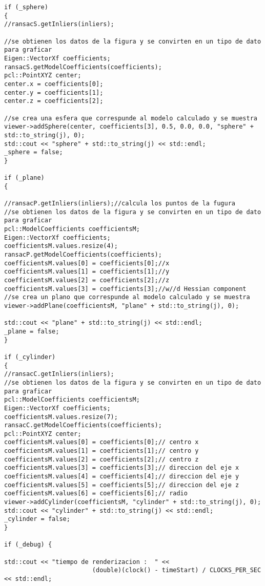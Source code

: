 {\begin{lstlisting}[caption={Archivo test.cpp}]
if (_sphere)
{
//ransacS.getInliers(inliers);

//se obtienen los datos de la figura y se convirten en un tipo de dato para graficar
Eigen::VectorXf coefficients;
ransacS.getModelCoefficients(coefficients);
pcl::PointXYZ center;
center.x = coefficients[0];
center.y = coefficients[1];
center.z = coefficients[2];

//se crea una esfera que correspunde al modelo calculado y se muestra
viewer->addSphere(center, coefficients[3], 0.5, 0.0, 0.0, "sphere" + std::to_string(j), 0);
std::cout << "sphere" + std::to_string(j) << std::endl;
_sphere = false;
}

if (_plane)
{

//ransacP.getInliers(inliers);//calcula los puntos de la fugura
//se obtienen los datos de la figura y se convirten en un tipo de dato para graficar
pcl::ModelCoefficients coefficientsM;
Eigen::VectorXf coefficients;
coefficientsM.values.resize(4);
ransacP.getModelCoefficients(coefficients);
coefficientsM.values[0] = coefficients[0];//x
coefficientsM.values[1] = coefficients[1];//y
coefficientsM.values[2] = coefficients[2];//z
coefficientsM.values[3] = coefficients[3];//w//d Hessian component
//se crea un plano que correspunde al modelo calculado y se muestra
viewer->addPlane(coefficientsM, "plane" + std::to_string(j), 0);

std::cout << "plane" + std::to_string(j) << std::endl;
_plane = false;
}

if (_cylinder)
{
//ransacC.getInliers(inliers);
//se obtienen los datos de la figura y se convirten en un tipo de dato para graficar
pcl::ModelCoefficients coefficientsM;
Eigen::VectorXf coefficients;
coefficientsM.values.resize(7);
ransacC.getModelCoefficients(coefficients);
pcl::PointXYZ center;
coefficientsM.values[0] = coefficients[0];// centro x
coefficientsM.values[1] = coefficients[1];// centro y
coefficientsM.values[2] = coefficients[2];// centro z
coefficientsM.values[3] = coefficients[3];// direccion del eje x
coefficientsM.values[4] = coefficients[4];// direccion del eje y 
coefficientsM.values[5] = coefficients[5];// direccion del eje z
coefficientsM.values[6] = coefficients[6];// radio
viewer->addCylinder(coefficientsM, "cylinder" + std::to_string(j), 0);
std::cout << "cylinder" + std::to_string(j) << std::endl;
_cylinder = false;
}

if (_debug) {

std::cout << "tiempo de renderizacion :  " << 
						(double)(clock() - timeStart) / CLOCKS_PER_SEC << std::endl;


\end{lstlisting}}
